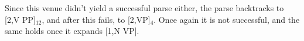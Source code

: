 \begin{examplebox}
\begin{center}
    \end{center}
    Since this venue didn't yield a successful parse either, the parse backtracks to [2,\psep V PP]$_{12}$, and after this fails, to [2,\psep VP]$_4$.
    Once again it is not successful, and the same holds once it expands [1,\psep N VP].
    \begin{center}
        \footnotesize
\end{center}
\end{examplebox}
